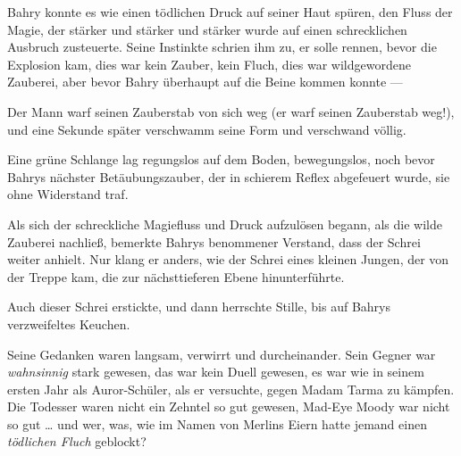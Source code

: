 Bahry konnte es wie einen tödlichen Druck auf seiner Haut spüren, den Fluss der Magie, der stärker und stärker und stärker wurde auf einen schrecklichen Ausbruch zusteuerte. Seine Instinkte schrien ihm zu, er solle rennen, bevor die Explosion kam, dies war kein Zauber, kein Fluch, dies war wildgewordene Zauberei, aber bevor Bahry überhaupt auf die Beine kommen konnte —

Der Mann warf seinen Zauberstab von sich weg (er warf seinen Zauberstab weg!), und eine Sekunde später verschwamm seine Form und verschwand völlig.

Eine grüne Schlange lag regungslos auf dem Boden, bewegungslos, noch bevor Bahrys nächster Betäubungszauber, der in schierem Reflex abgefeuert wurde, sie ohne Widerstand traf.

Als sich der schreckliche Magiefluss und Druck aufzulösen begann, als die wilde Zauberei nachließ, bemerkte Bahrys benommener Verstand, dass der Schrei weiter anhielt. Nur klang er anders, wie der Schrei eines kleinen Jungen, der von der Treppe kam, die zur nächsttieferen Ebene hinunterführte.

Auch dieser Schrei erstickte, und dann herrschte Stille, bis auf Bahrys verzweifeltes Keuchen.

Seine Gedanken waren langsam, verwirrt und durcheinander. Sein Gegner war \emph{wahnsinnig} stark gewesen, das war kein Duell gewesen, es war wie in seinem ersten Jahr als Auror-Schüler, als er versuchte, gegen Madam Tarma zu kämpfen. Die Todesser waren nicht ein Zehntel so gut gewesen, Mad-Eye Moody war nicht so gut … und wer, was, wie im Namen von Merlins Eiern hatte jemand einen \emph{tödlichen Fluch} geblockt?

